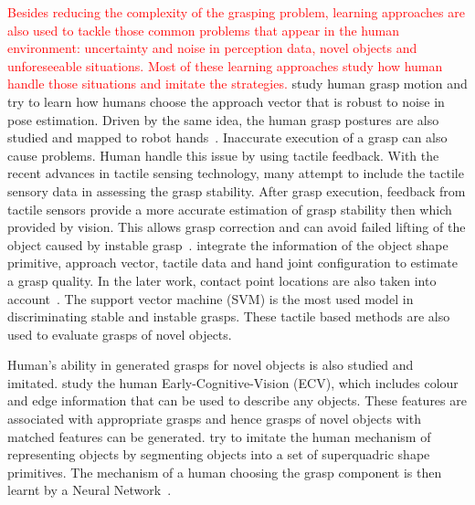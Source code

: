 \textcolor{red}{Besides reducing the complexity of the grasping problem, learning approaches are also used to tackle those common problems that appear in the human environment: uncertainty and noise in perception data, novel objects and unforeseeable situations. Most of these learning approaches study how human handle those situations and imitate the strategies.} \citet{ekvall2007learning,stulp2011learning} study human grasp motion and try to learn how humans choose the approach vector that is robust to noise in pose estimation. Driven by the same idea, the human grasp postures are also studied and mapped to robot hands~\citep{tegin2009demonstration}. Inaccurate execution of a grasp can also cause problems. Human handle this issue by using tactile feedback.
With the recent advances in tactile sensing technology, many attempt to include the tactile sensory data in assessing the grasp stability.
After grasp execution, feedback from tactile sensors provide a more accurate estimation of grasp stability then which provided by vision. This allows grasp correction and can avoid failed lifting of the object caused by instable grasp~\citep{li2014learning}.
\citet{bekiroglu2011assessing} integrate the information of the object shape primitive, approach vector, tactile data and hand joint configuration to estimate a grasp quality.
In the later work, contact point locations are also taken into account~\citep{dang2012learning,dang2014stable}. The support vector machine (SVM) is the most used model in discriminating stable and instable grasps. These tactile based methods are also used to evaluate grasps of novel objects.

Human's ability in generated grasps for novel objects is also studied and imitated.
\citet{detry2009learning} study the human Early-Cognitive-Vision (ECV), which includes colour and edge information that can be used to describe any objects. These features are associated with appropriate grasps and hence grasps of novel objects with matched features can be generated.
\citet{el2007learning} try to imitate the human mechanism of representing objects by segmenting objects into a set of superquadric shape primitives. The mechanism of a human choosing the grasp component is then learnt by a Neural Network~\citep{el2010new}.




